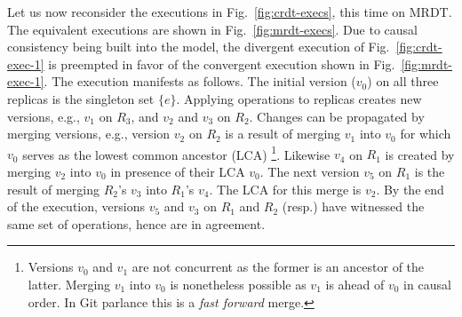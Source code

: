 Let us now reconsider the executions in Fig.~\ref{fig:crdt-execs},
this time on  MRDT. The equivalent executions are shown in
Fig.~\ref{fig:mrdt-execs}. Due to causal consistency being built into
the model, the divergent execution of Fig.~\ref{fig:crdt-exec-1} is
preempted in favor of the convergent execution shown in
Fig.~\ref{fig:mrdt-exec-1}. The execution manifests as follows.  The
initial version ($v_0$) on all three replicas  is the singleton set
$\{e\}$. Applying operations to replicas creates new versions, e.g.,
$v_1$ on $R_3$, and $v_2$ and $v_3$ on $R_2$. Changes can be
propagated by merging versions, e.g., version $v_2$ on $R_2$ is a
result of merging $v_1$ into $v_0$ for which $v_0$ serves as the
lowest common ancestor (LCA)
  \footnote{Versions $v_0$ and $v_1$ are not concurrent as the
  former is an ancestor of the latter. Merging $v_1$ into $v_0$ is
  nonetheless possible as $v_1$ is ahead of $v_0$ in causal order. In
  Git parlance this is a \emph{fast forward} merge.}.
Likewise $v_4$ on $R_1$ is created by merging $v_2$ into $v_0$ in
presence of their LCA $v_0$. The next version $v_5$ on $R_1$ is the
result of merging $R_2$'s $v_3$ into $R_1$'s $v_4$. The LCA for this
merge is $v_2$. By the end of the execution, versions $v_5$ and $v_3$
on $R_1$ and $R_2$ (resp.) have witnessed the same set of operations,
hence are in agreement.



